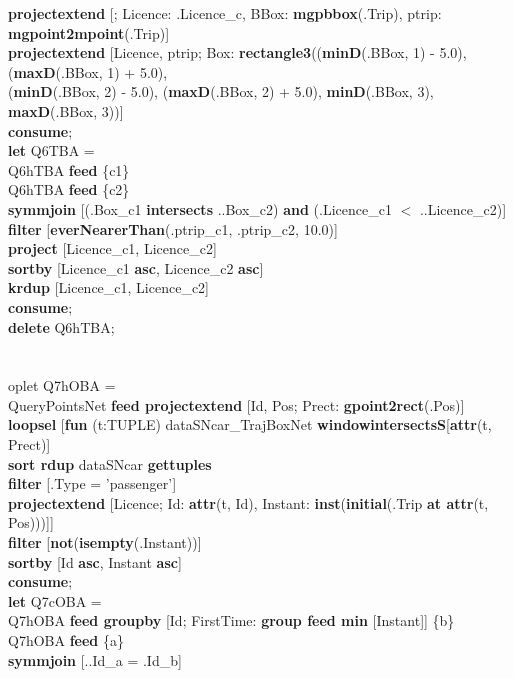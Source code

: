 \documentclass[a4paper]{article}
\newcommand{\op}[1]{\textbf{#1}}
\begin{document}
\begin{scriptsize}
\begin{tabbing}
\>\op{projectextend} [; Licence: .Licence\_c, BBox: \op{mgpbbox}(.Trip), ptrip: \op{mgpoint2mpoint}(.Trip)]\\
\>\op{projectextend} [Licence, ptrip; Box: \op{rectangle3}((\op{minD}(.BBox, 1) - 5.0), (\op{maxD}(.BBox, 1) + 5.0),\\
\>\>\>\>(\op{minD}(.BBox, 2) - 5.0), (\op{maxD}(.BBox, 2) + 5.0), \op{minD}(.BBox, 3), \op{maxD}(.BBox, 3))]\\
\op{consume};\\
\op{let} Q6TBA =\\
\>Q6hTBA \op{feed} \{c1\}\\
\>Q6hTBA \op{feed} \{c2\}\\
\>\op{symmjoin} [(.Box\_c1 \op{intersects} ..Box\_c2) \op{and} (.Licence\_c1 $<$ ..Licence\_c2)]\\
\>\op{filter} [\op{everNearerThan}(.ptrip\_c1, .ptrip\_c2, 10.0)]\\
\>\op{project} [Licence\_c1, Licence\_c2]\\
\>\op{sortby} [Licence\_c1 \op{asc}, Licence\_c2 \op{asc}]\\
\>\op{krdup} [Licence\_c1, Licence\_c2]\\
\op{consume};\\
\op{delete} Q6hTBA;\\
\\
\\op{let} Q7hOBA =\\
\>QueryPointsNet \op{feed projectextend} [Id, Pos; Prect: \op{gpoint2rect}(.Pos)]\\
\>\op{loopsel} [\op{fun} (t:TUPLE) dataSNcar\_TrajBoxNet \op{windowintersectsS}[\op{attr}(t, Prect)]\\
\>\>\op{sort rdup} dataSNcar \op{gettuples}\\
\>\>\op{filter} [.Type = 'passenger']\\
\>\>\op{projectextend} [Licence; Id: \op{attr}(t, Id), Instant: \op{inst}(\op{initial}(.Trip \op{at attr}(t, Pos)))]]\\
\>\op{filter} [\op{not}(\op{isempty}(.Instant))]\\
\>\op{sortby} [Id \op{asc}, Instant \op{asc}]\\
\op{consume};\\
\op{let} Q7cOBA =\\
\>Q7hOBA \op{feed groupby} [Id; FirstTime: \op{group feed min} [Instant]] \{b\}\\
\>Q7hOBA \op{feed} \{a\}\\
\>\op{symmjoin} [..Id\_a = .Id\_b]\\

\end{tabbing}
\end{scriptsize}
\end{document}
